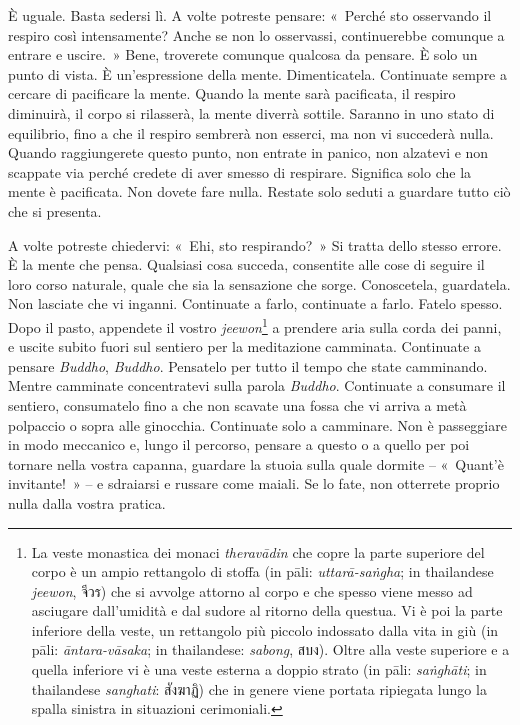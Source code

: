 È uguale. Basta sedersi lì. A volte potreste pensare: «~Perché sto
osservando il respiro così intensamente? Anche se non lo osservassi,
continuerebbe comunque a entrare e uscire.~» Bene, troverete comunque
qualcosa da pensare. È solo un punto di vista. È un'espressione della
mente. Dimenticatela. Continuate sempre a cercare di pacificare la
mente. Quando la mente sarà pacificata, il respiro diminuirà, il corpo
si rilasserà, la mente diverrà sottile. Saranno in uno stato di
equilibrio, fino a che il respiro sembrerà non esserci, ma non vi
succederà nulla. Quando raggiungerete questo punto, non entrate in
panico, non alzatevi e non scappate via perché credete di aver smesso di
respirare. Significa solo che la mente è pacificata. Non dovete fare
nulla. Restate solo seduti a guardare tutto ciò che si presenta.

A volte potreste chiedervi: «~Ehi, sto respirando?~» Si tratta dello
stesso errore. È la mente che pensa. Qualsiasi cosa succeda, consentite
alle cose di seguire il loro corso naturale, quale che sia la sensazione
che sorge. Conoscetela, guardatela. Non lasciate che vi inganni.
Continuate a farlo, continuate a farlo. Fatelo spesso. Dopo il pasto,
appendete il vostro \emph{jeewon}\footnote{La veste monastica dei monaci
  \emph{theravādin} che copre la parte superiore del corpo è un ampio
  rettangolo di stoffa (in pāli: \emph{uttarā-saṅgha}; in thailandese
  \emph{jeewon}, จีวร) che si avvolge attorno al corpo e che spesso
  viene messo ad asciugare dall'umidità e dal sudore al ritorno della
  questua. Vi è poi la parte inferiore della veste, un rettangolo più
  piccolo indossato dalla vita in giù (in pāli: \emph{āntara-vāsaka}; in
  thailandese: \emph{sabong}, สบง). Oltre alla veste superiore e a
  quella inferiore vi è una veste esterna a doppio strato (in pāli:
  \emph{saṅghāti}; in thailandese \emph{sanghati}: สังฆาฏิ) che in
  genere viene portata ripiegata lungo la spalla sinistra in situazioni
  cerimoniali.} a prendere aria sulla corda dei panni, e uscite subito
fuori sul sentiero per la meditazione camminata. Continuate a pensare
\emph{Buddho}, \emph{Buddho}. Pensatelo per tutto il tempo che state
camminando. Mentre camminate concentratevi sulla parola \emph{Buddho}.
Continuate a consumare il sentiero, consumatelo fino a che non scavate
una fossa che vi arriva a metà polpaccio o sopra alle ginocchia.
Continuate solo a camminare. Non è passeggiare in modo meccanico e,
lungo il percorso, pensare a questo o a quello per poi tornare nella
vostra capanna, guardare la stuoia sulla quale dormite -- «~Quant'è
invitante!~» -- e sdraiarsi e russare come maiali. Se lo fate, non
otterrete proprio nulla dalla vostra pratica.


